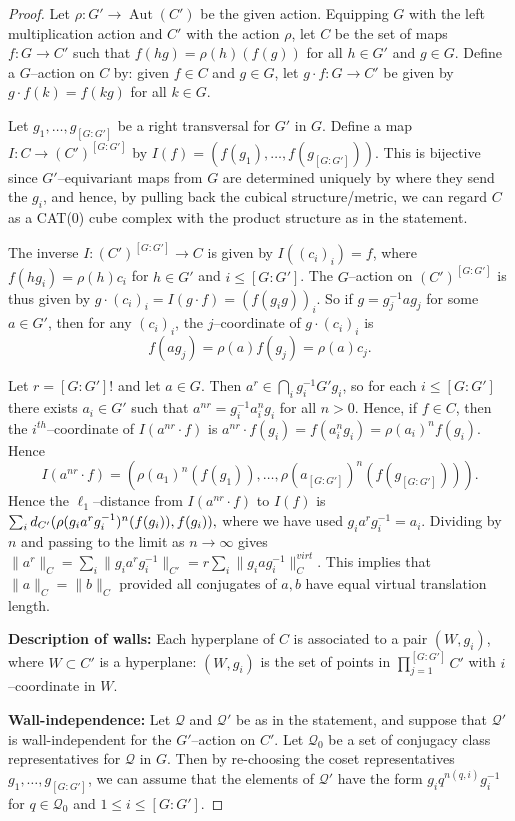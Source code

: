 \documentclass[11pt,oneside]{amsart}
\theoremstyle{definition}
\DeclareMathOperator{\Aut}{Aut}
\newcommand{\dist}{\textup{\textsf{d}}}
\begin{document}
\begin{proof}
Let $\rho:G'\to\Aut(C')$ be the given action.  Equipping $G$ with the left multiplication action and $C'$ with the action $\rho$, let $C$ be the set of maps $f:G\to C'$ such that $f(hg)=\rho(h)(f(g))$ for all $h\in G'$ and $g\in G$.  Define a $G$--action on $C$ by: given $f\in C$ and $g\in G$, let $g\cdot f:G\to C'$ be given by $g\cdot f(k)=f(kg)$ for all $k\in G$.

Let $g_1,\ldots,g_{[G:G']}$ be a right transversal for $G'$ in $G$.  Define a map $I:C\to (C')^{[G:G']}$ by $I(f)=(f(g_1),\ldots,f(g_{[G:G']}))$.  This is bijective since $G'$--equivariant maps from $G$ are determined uniquely by where they send the $g_i$, and hence, by pulling back the cubical structure/metric, we can regard $C$ as a CAT(0) cube complex with the product structure as in the statement.


The inverse $I:(C')^{[G:G']}\to C$ is given by $I((c_i)_i)=f$, where $f(hg_i)=\rho(h)c_i$ for $h\in G'$ and $i\leq [G:G']$.  The $G$--action on $(C')^{[G:G']}$ is thus given by $g\cdot(c_i)_i=I(g\cdot f)=(f(g_ig))_i$.  So if $g=g_j^{-1}ag_j$ for some $a\in G'$, then for any $(c_i)_i$, the $j$--coordinate of $g\cdot(c_i)_i$ is $$f(ag_j)=\rho(a)f(g_j)=\rho(a)c_j.$$

Let $r=[G:G']!$ and let $a\in G$.  Then $a^r\in \bigcap_ig_i^{-1}G'g_i$, so for each $i\leq [G:G']$ there exists $a_i\in G'$ such that $a^{nr}=g_i^{-1}a_i^ng_i$ for all $n>0$.  Hence, if $f\in C$, then the $i^{th}$--coordinate of $I(a^{nr}\cdot f)$ is $a^{nr}\cdot f(g_i)=f(a_i^ng_i)=\rho(a_i)^nf(g_i)$.  Hence
$$I(a^{nr}\cdot f)=(\rho(a_1)^n(f(g_1)),\ldots,\rho(a_{[G:G']})^n(f(g_{[G:G']}))).$$
Hence the $\ell_1$--distance from $I(a^{nr}\cdot f)$ to $I(f)$ is 
$\sum_i\dist_{C'}(\rho(g_ia^{r}g_i^{-1})^n(f(g_i)),f(g_i)),$
where we have used $g_ia^rg_i^{-1}=a_i$. Dividing by $n$ and passing to the limit as $n\to\infty$ gives $\|a^r\|_C=\sum_i\|g_ia^rg_i^{-1}\|_{C'}=r\sum_i\|g_iag_i^{-1}\|^{virt}_C.$  This implies that $\|a\|_C=\|b\|_C$ provided all conjugates of $a,b$ have equal virtual translation length.

\textbf{Description of walls:}  Each hyperplane of $C$ is associated to a pair $(W,g_i)$, where $W\subset C'$ is a hyperplane: $(W,g_i)$ is the set of points in $\prod_{j=1}^{[G:G']}C'$ with $i$--coordinate in $W$.  

\textbf{Wall-independence:}  Let $\mathcal Q$ and $\mathcal Q'$ be as in the statement, and suppose that $\mathcal Q'$ is wall-independent for the $G'$--action on $C'$.  Let $\mathcal Q_0$ be a set of conjugacy class representatives for $\mathcal Q$ in $G$.  Then by re-choosing the coset representatives $g_1,\ldots,g_{[G:G']}$, we can assume that the elements of $\mathcal Q'$ have the form $g_iq^{n(q,i)}g_i^{-1}$ for $q\in\mathcal Q_0$ and $1\leq i\leq [G:G']$.  


\end{proof}
\end{document}
